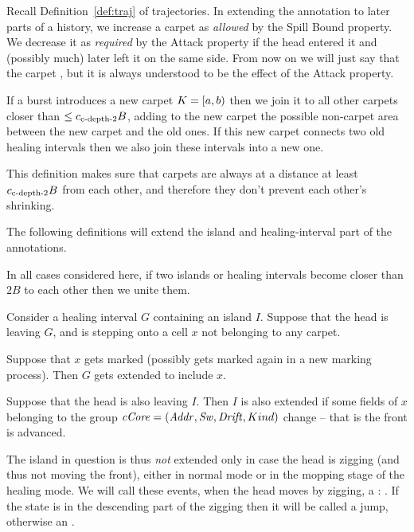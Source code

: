 \documentclass[12pt]{memoir}
\renewcommand{\le}{\leq}
\newcommand{\fld}[1]{\ensuremath{\textit{#1\/}}}
\def\B{B}
\newcommand{\Addr}{\fld{Addr}}
\newcommand{\cCore}{\fld{cCore}}
\newcommand{\Drift}{\fld{Drift}}
\newcommand{\Sweep}{\fld{Sw}}
\newcommand{\cns}[1]{c_{\textrm{\upshape #1}}}
\newcommand{\cCDepth}[1]{\cns{c-depth-#1}}
\begin{document}
\begin{definition}[Carpets]\label{def:carpets}
Recall Definition~\ref{def:traj} of trajectories.
In extending the annotation to later parts of a history,
we increase a carpet as \emph{allowed} by the Spill Bound property.
We decrease it as \emph{required} by the Attack property
if the head entered it and (possibly much) later left it on the same side.
From now on we will just say that the carpet , but it is always
understood to be the effect of the Attack property.

If a burst introduces a new carpet \( K=\left[a,b\right) \) then we join it to all other
carpets closer than \( \le\cCDepth2\B \), adding to the new carpet the 
possible non-carpet area between the new carpet and the old ones.
If this new carpet connects two old healing intervals then we also
join these intervals into a new one.
\end{definition}

This definition makes sure that carpets are always at a distance at least
\( \cCDepth2\B \) from each other, and therefore they don't prevent 
each other's shrinking.

The following definitions will extend the island and healing-interval part of
the annotations.

\begin{definition}
\label{def:extending-islands}
In all cases considered here, if two islands or
healing intervals become closer than \( 2\B \) to each other then we unite them.

Consider a healing interval \( G \) containing an island \( I \).
Suppose that the head is leaving \( G \), and is stepping onto a
cell \( x \) not belonging to any carpet.
\begin{enumIn}

\item 
Suppose that \( x \) gets marked (possibly gets marked again in a new marking process).
Then \( G \) gets extended to include \( x \).

\item
Suppose that the head is also leaving \( I \).
Then \( I \) is also extended %
if some fields of \( x \) belonging to the group
\( \cCore =(\Addr, \Sweep, \Drift, Kind) \) change -- that is the front is advanced.

\end{enumIn}

The island in question is thus \emph{not} extended only in case
the head is zigging (and thus not moving the front), either in normal mode or in
the mopping stage of the healing mode.
We will call these events, when the head moves by zigging, a :
.
If the state is in the descending part of the zigging then it will be called a
 jump, otherwise an .
\end{definition}
\end{document}
